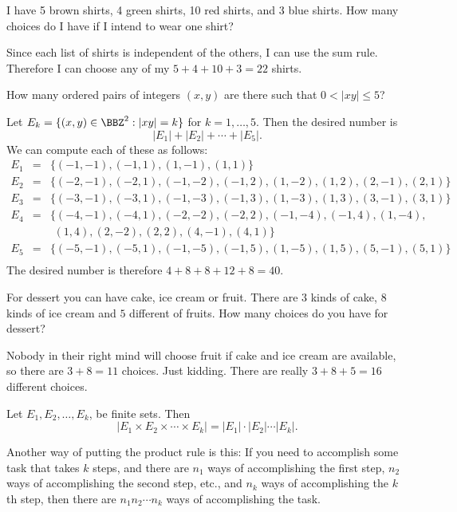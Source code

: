 \begin{exa}
I have 5 brown shirts, 4 green shirts, 10 red shirts, and 3 blue shirts.  How many choices
do I have if I intend to wear one shirt?
\begin{sol}
Since each list of shirts is independent of the others, I can use the sum rule.
Therefore I can choose any of my $5+4+10+3=22$ shirts.
\end{sol}
\end{exa}

\begin{exa}
How many ordered pairs of integers $(x, y)$ are there such that $0<
|xy| \leq 5$?
\begin{sol} Let $E_k = \{(x, y) \in \BBZ^2: |xy| = k\}$ for $k = 1,
\ldots , 5$. Then the desired number is 
$$|E_1| + |E_2| + \cdots + |E_{5}|.$$ 
We can compute each of these as follows:
$$\begin{array}{lll}E_1 & = & \{(-1,-1), (-1, 1), (1, -1), (1,1)\} \\
E_2 & = & \{(-2,-1), (-2, 1), (-1,-2), (-1, 2), (1, -2), (1,2), (2,-1), (2,1)\} \\
E_3 & = & \{(-3,-1), (-3, 1), (-1,-3), (-1, 3), (1, -3), (1,3), (3,-1), (3,1)\} \\
E_4 & = & \{(-4,-1), (-4, 1), (-2, -2), (-2, 2),  (-1,-4), (-1, 4), (1, -4), \\
&&\, \, (1,4), (2,-2),(2,2),  (4,-1), (4,1)\} \\
E_5 & = & \{(-5,-1), (-5, 1), (-1,-5), (-1, 5), (1, -5), (1,5), (5,-1), (5,1)\} \\
  \end{array}$$
  The desired number is therefore $4+ 8 + 8 + 12 + 8 = 40$.
\end{sol}
\end{exa}

\begin{exer}
For dessert you can have cake, ice cream or fruit.  There are $3$ kinds of cake,
$8$ kinds of ice cream and $5$ different of fruits.  How many choices do you have
for dessert?

\noindent
\answerline
\begin{answer}
Nobody in their right mind will choose fruit if cake and ice cream are
available, so there are $3+8=11$ choices.
Just kidding.  There are really $3+8+5=16$ different choices.
\end{answer}
\end{exer}

\begin{thm}
\label{rul:product} Let  $E_1, E_2, \ldots, E_k$, be finite  sets. Then
$$|E_1 \times E_2 \times \cdots \times E_k| = |E_1| \cdot |E_2|  \cdots  |E_k|.$$

Another way of putting the product rule is this:
If you need to accomplish some task that takes $k$ steps, and there are $n_1$ ways of
accomplishing the first step, $n_2$ ways of accomplishing the second step, etc., 
and $n_k$ ways of accomplishing the $k$th step, then there are $n_1n_2\cdots n_k$
ways of accomplishing the task.
\end{thm}


